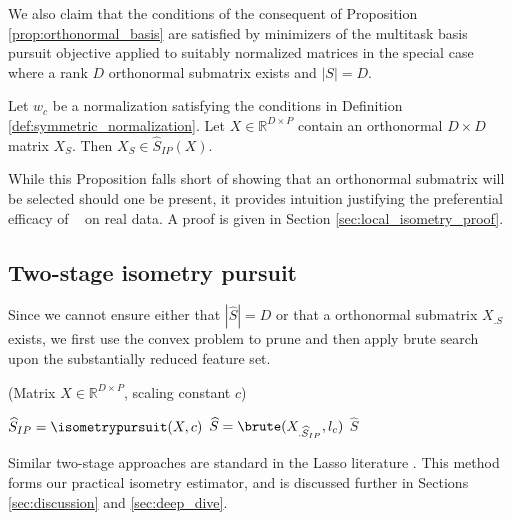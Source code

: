 We also claim that the conditions of the consequent of Proposition \ref{prop:orthonormal_basis} are satisfied by minimizers of the multitask basis pursuit objective applied to suitably normalized matrices in the special case where a rank $D$ orthonormal submatrix exists and $|S| = D$.
\begin{proposition}
Let $w_c$ be a normalization satisfying the conditions in Definition \ref{def:symmetric_normalization}.
Let $X \in \mathbb R^{D \times P}$ contain an orthonormal $D \times D$ matrix $X_S$.
Then $X_S \in \widehat S_{IP} (X) $.
\label{prop:unitary_selection}
\end{proposition}
While this Proposition falls short of showing that an orthonormal submatrix will be selected should one be present, it provides intuition justifying the preferential efficacy of \isometrypursuit~ on real data.
A proof is given in Section \ref{sec:local_isometry_proof}.

\subsection{Two-stage isometry pursuit}

Since we cannot ensure either that $|\widehat {  S}| = D$ or that a orthonormal submatrix $X_{.S}$ exists, we first use the convex problem to prune and then apply brute search upon the substantially reduced feature set.

\begin{algorithm}[H]
\caption{\tsip(Matrix ${X} \in \mathbb{R}^{D \times P}$, scaling constant $c$)}
\begin{algorithmic}[1]
\STATE $\widehat{S}_{IP} = \text{\isometrypursuit}( X, c)$
\STATE $\widehat{S} = \text {\brute}({X}_{.\widehat{S}_{IP}}, l_c)$
 $\widehat{S}$
\end{algorithmic}
\end{algorithm}

Similar two-stage approaches are standard in the Lasso literature \cite{Hesterberg2008-iy}.
This method forms our practical isometry estimator, and is discussed further in Sections \ref{sec:discussion} and \ref{sec:deep_dive}.